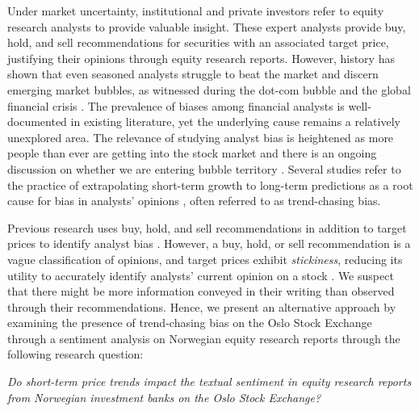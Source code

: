 Under market uncertainty, institutional and private investors refer to equity research analysts to provide valuable insight. These expert analysts provide buy, hold, and sell recommendations for securities with an associated target price, justifying their opinions through equity research reports. However, history has shown that even seasoned analysts struggle to beat the market and discern emerging market bubbles, as witnessed during the dot-com bubble and the global financial crisis \parencite{tuckett2009addressing}. The prevalence of biases among financial analysts is well-documented in existing literature, yet the underlying cause remains a relatively unexplored area. The relevance of studying analyst bias is heightened as more people than ever are getting into the stock market \parencite{aksjenorge2023} and there is an ongoing discussion on whether we are entering bubble territory \parencite{forbesAIbubble}. Several studies refer to the practice of extrapolating short-term growth to long-term predictions as a root cause for bias in analysts’ opinions \parencite{barberis2018extrapolation}, often referred to as trend-chasing bias. 

Previous research uses buy, hold, and sell recommendations in addition to target prices to identify analyst bias \parencite{clarkson2020target}. However, a buy, hold, or sell recommendation is a vague classification of opinions, and target prices exhibit \textit{stickiness}, reducing its utility to accurately identify analysts' current opinion on a stock \parencite{bonini2010target}. We suspect that there might be more information conveyed in their writing than observed through their recommendations. Hence, we present an alternative approach by examining the presence of trend-chasing bias on the Oslo Stock Exchange through a sentiment analysis on Norwegian equity research reports through the following research question:

\vspace{24pt}
\begin{center}
    \parbox{\textwidth}{\centering\textit{Do short-term price trends impact the textual sentiment in equity research reports from Norwegian investment banks on the Oslo Stock Exchange?}}
\end{center}


    
